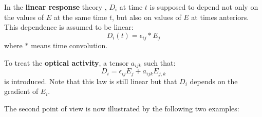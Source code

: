 \documentclass[12pt]{book}
\begin{document}
\begin{exmp}
In the {\bf linear response } theory , $D_i$ at time $t$ is supposed to depend not only on the values of
$E$ at the same time $t$, but also on values of $E$ at times anteriors. This
dependence is assumed to be linear:
\begin{equation}
D_i(t)=\epsilon_{ij}*E_j
\end{equation}
where $*$ means time convolution.
\end{exmp}

\begin{exmp}
To treat the {\bf optical activity}\cite{ph:elect:LandauEle}, a
tensor
$a_{ijk}$ such that:
\begin{equation}
D_i=\epsilon_{ij}E_j+a_{ijk}E_{j,k}
\end{equation}
is introduced. Note that this law is still linear but that $D_i$ depends on the
gradient of $E_i$.
\end{exmp}
The second point of view is now illustrated by the following two examples:
\end{document}
